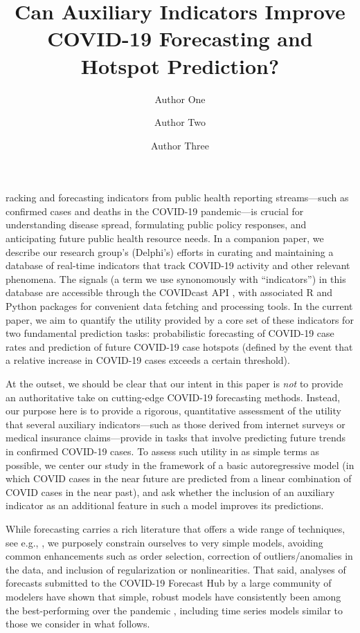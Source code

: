 \documentclass[9pt,twocolumn,twoside,lineno]{pnas-new}
\title{Can Auxiliary Indicators Improve COVID-19 Forecasting and Hotspot  
  Prediction?}
\author[a,c,1]{Author One}
\author[b,1,2]{Author Two}
\author[a]{Author Three}
\affil[a]{Affiliation One}
\affil[b]{Affiliation Two}
\affil[c]{Affiliation Three}
\begin{document}
\maketitle
\thispagestyle{firststyle}

racking and forecasting indicators from public health reporting
streams---such as confirmed cases and deaths in the COVID-19 pandemic---is
crucial for understanding disease spread, formulating public policy responses,
and anticipating future public health resource needs.  In a companion paper, we
describe our research group's (Delphi's) efforts in curating and maintaining a 
database of real-time indicators that track COVID-19 activity and other relevant
phenomena. The signals (a term we use synonomously with ``indicators'') in this
database are accessible through the COVIDcast API \cite{CovidcastAPI}, with
associated R \cite{CovidcastR} and Python \cite{CovidcastPy} packages for
convenient data fetching and processing tools. In the current paper, we aim to
quantify the utility provided by a core set of these indicators for two
fundamental prediction tasks: probabilistic forecasting of COVID-19 case 
rates and prediction of future COVID-19 case hotspots (defined by the event that
a relative increase in COVID-19 cases exceeds a certain threshold). 

At the outset, we should be clear that our intent in this paper is \textit{not}
to provide an authoritative take on cutting-edge COVID-19 forecasting methods.
Instead, our purpose here is to provide a rigorous, quantitative assessment of
the utility that several auxiliary indicators---such as those derived from
internet surveys or medical insurance claims---provide in tasks that involve
predicting future trends in confirmed COVID-19 cases. To assess such utility in
as simple terms as possible, we center our study in the framework of a basic
autoregressive model (in which COVID cases in the near future are predicted from  
a linear combination of COVID cases in the near past), and ask whether the 
inclusion of an auxiliary indicator as an additional feature in such a model
improves its predictions. 

While forecasting carries a rich literature that offers a wide range of
techniques, see e.g., \cite{Hyndman:2018}, we purposely constrain ourselves to
very simple models, avoiding common enhancements such as order selection,
correction of outliers/anomalies in the data, and inclusion of regularization or
nonlinearities. That said, analyses of forecasts submitted to the COVID-19
Forecast Hub \cite{ForecastHub} by a large community of modelers have shown that
simple, robust models have consistently been among the best-performing over the
pandemic \cite{Cramer:2021}, including time series models similar to those we
consider in what follows.   
\end{document}
